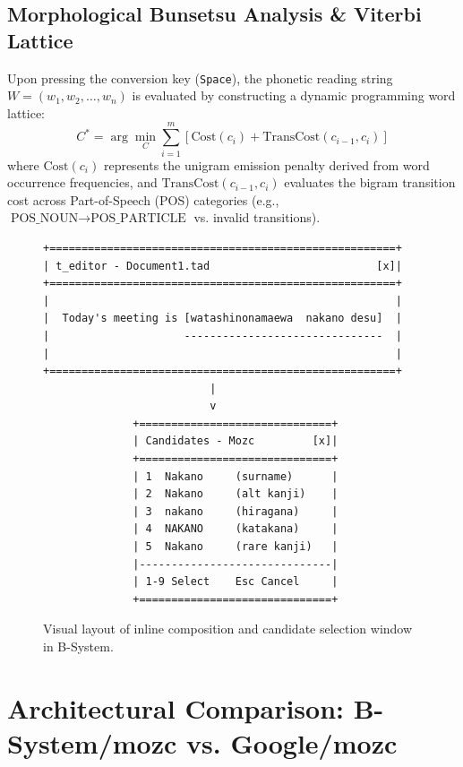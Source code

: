 \documentclass[10pt,journal,compsoc,twocolumn]{article}
\begin{document}
\subsection{Morphological Bunsetsu Analysis \& Viterbi Lattice}
Upon pressing the conversion key (\texttt{Space}), the phonetic reading string $W = (w_1, w_2, \dots, w_n)$ is evaluated by constructing a dynamic programming word lattice:
\begin{equation}
C^* = \arg\min_{C} \sum_{i=1}^{m} \left[ \text{Cost}(c_i) + \text{TransCost}(c_{i-1}, c_i) \right]
\end{equation}
where $\text{Cost}(c_i)$ represents the unigram emission penalty derived from word occurrence frequencies, and $\text{TransCost}(c_{i-1}, c_i)$ evaluates the bigram transition cost across Part-of-Speech (POS) categories (e.g., $\text{POS\_NOUN} \to \text{POS\_PARTICLE}$ vs. invalid transitions).

\begin{figure}[htbp]
\centering
\begin{lstlisting}
+======================================================+
| t_editor - Document1.tad                          [x]|
+======================================================+
|                                                      |
|  Today's meeting is [watashinonamaewa  nakano desu]  |
|                     -------------------------------  |
|                                                      |
+======================================================+
                          |
                          v
              +==============================+
              | Candidates - Mozc         [x]|
              +==============================+
              | 1  Nakano     (surname)      |
              | 2  Nakano     (alt kanji)    |
              | 3  nakano     (hiragana)     |
              | 4  NAKANO     (katakana)     |
              | 5  Nakano     (rare kanji)   |
              |------------------------------|
              | 1-9 Select    Esc Cancel     |
              +==============================+
\end{lstlisting}
\caption{Visual layout of inline composition and candidate selection window in B-System.}
\label{fig:wireframe}
\end{figure}

\section{Architectural Comparison: B-System/mozc vs. Google/mozc}
\label{sec:comparison}
\end{document}
